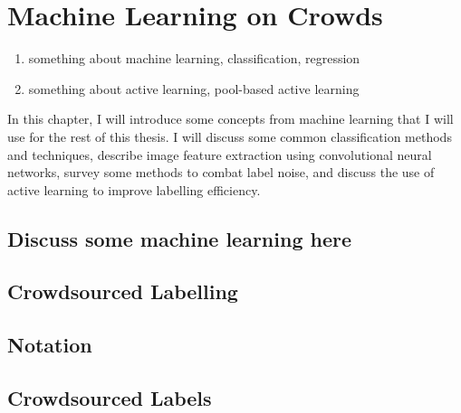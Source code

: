 \chapter{Machine Learning on Crowds}

\begin{enumerate}
    \item something about machine learning, classification, regression
    \item something about active learning, pool-based active learning
\end{enumerate}

 In this chapter, I will introduce some
concepts from machine learning that I will use for the rest of this thesis. I
will discuss some common classification methods and techniques, describe image
feature extraction using convolutional neural networks, survey some methods to
combat label noise, and discuss the use of active learning to improve labelling
efficiency.

\section{Discuss some machine learning here}

\section{Crowdsourced Labelling}

    \section{Notation}


    \section{Crowdsourced Labels}
        
